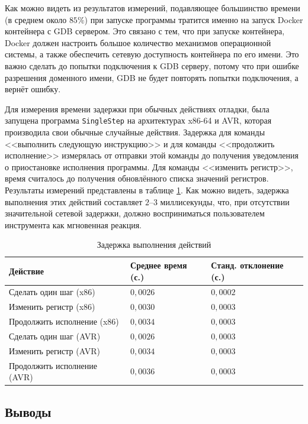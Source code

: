 \documentclass[a4paper,article,14pt]{extarticle}
\begin{document}
Как можно видеть из результатов измерений, подавляющее большинство времени (в среднем около $85\%$) при запуске программы тратится именно на запуск Docker контейнера с GDB сервером. Это связано с тем, что при запуске контейнера, Docker должен настроить большое количество механизмов операционной системы, а также обеспечить сетевую доступность контейнера по его имени. Это важно сделать до попытки подключения к GDB серверу, потому что при ошибке разрешения доменного имени, GDB не будет повторять попытки подключения, а вернёт ошибку.

Для измерения времени задержки при обычных действиях отладки, была запущена программа \texttt{SingleStep} на архитектурах x86-64 и AVR, которая производила свои обычные случайные действия. Задержка для команды <<выполнить следующую инструкцию>> и для команды <<продолжить исполнение>> измерялась от отправки этой команды до получения уведомления о приостановке исполнения программы. Для команды <<изменить регистр>>, время считалось до получения обновлённого списка значений регистров. Результаты измерений представлены в таблице \ref{table:actiondelay}. Как можно видеть, задержка выполнения этих действий составляет $2$--$3$ миллисекунды, что, при отсутствии значительной сетевой задержки, должно восприниматься пользователем инструмента как мгновенная реакция.

\begin{table}[ht]
\small
    \begin{tabular}{|p{6cm}|p{4.5cm}|p{4.5cm}|}
    \hline
    Действие & Среднее время (с.)  & Станд. отклонение (с.) \\
    \hline
Сделать один шаг (x86) & $0{,}0026$ & $0{,}0002$ \\ \hline
Изменить регистр (x86) & $0{,}0030$ & $0{,}0003$ \\ \hline
Продолжить исполнение (x86) & $0{,}0034$ & $0{,}0003$ \\ \hline
Сделать один шаг (AVR) & $0{,}0026$ & $0{,}0003$ \\ \hline
Изменить регистр (AVR) & $0{,}0034$ & $0{,}0003$ \\ \hline
Продолжить исполнение (AVR) & $0{,}0036$ & $0{,}0003$ \\ \hline
    \end{tabular}
\caption{\label{table:actiondelay}Задержка выполнения действий}
\normalsize
\end{table}

\subsection{Выводы}
\end{document}
